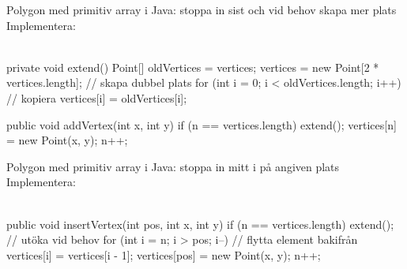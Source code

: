 \begin{Slide}{Polygon med primitiv array i Java: stoppa in sist och vid behov skapa mer plats}\SlideFontSmall
Implementera:\\
\\
\pause
\begin{Code}[numberstyle=,numbers=left,language=Java]
    private void extend(){
        Point[] oldVertices = vertices;
        vertices = new Point[2 * vertices.length]; // skapa dubbel plats
        for (int i = 0; i < oldVertices.length; i++) {  // kopiera
            vertices[i] = oldVertices[i];
        }
    }

    public void addVertex(int x, int y) {
        if (n == vertices.length) extend();
        vertices[n] = new Point(x, y);
        n++;
    }
\end{Code}
\end{Slide}


\begin{Slide}{Polygon med primitiv array i Java: stoppa in mitt i på angiven plats }\SlideFontSmall
Implementera:\\
\\
\pause
\begin{Code}[numberstyle=,numbers=left,language=Java]
    public void insertVertex(int pos, int x, int y) {
        if (n == vertices.length) extend();   // utöka vid behov
        for (int i = n; i > pos; i--) {       // flytta element bakifrån
            vertices[i] = vertices[i - 1];
        }
        vertices[pos] = new Point(x, y);
        n++;
    }
\end{Code}
\end{Slide}



